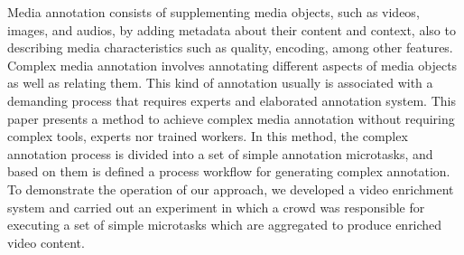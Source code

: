 Media annotation consists of supplementing media objects, such as videos, images, and audios, by adding metadata about their content and context, also to describing media characteristics such as quality, encoding, among other features. Complex media annotation involves annotating different aspects of media objects as well as relating them. This kind of annotation usually is associated with a demanding process that requires experts and elaborated annotation system. This paper presents a method to achieve complex media annotation without requiring complex tools, experts nor trained workers. In this method, the complex annotation process is divided into a set of simple annotation microtasks, and based on them is defined a process workflow for generating complex annotation. To demonstrate the operation of our approach, we developed a video enrichment system and carried out an experiment in which a crowd was responsible for executing a set of simple microtasks which are aggregated to produce enriched video content.

